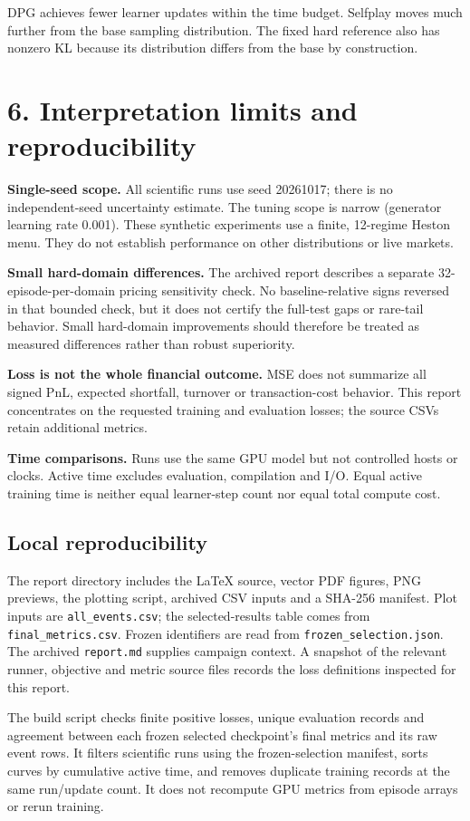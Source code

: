 \documentclass[11pt,a4paper]{article}
\begin{document}
DPG achieves fewer learner updates within the time budget. Selfplay moves much
further from the base sampling distribution. The fixed hard reference also has
nonzero KL because its distribution differs from the base by construction.

\clearpage
\section*{6. Interpretation limits and reproducibility}
\textbf{Single-seed scope.} All scientific runs use seed 20261017; there is no
independent-seed uncertainty estimate. The tuning scope is narrow (generator
learning rate 0.001). These synthetic experiments use a finite, 12-regime Heston
menu. They do not establish performance on other distributions or live markets.

\textbf{Small hard-domain differences.} The archived report describes a separate
32-episode-per-domain pricing sensitivity check. No baseline-relative signs
reversed in that bounded check, but it does not certify the full-test gaps or
rare-tail behavior. Small hard-domain improvements should therefore be treated
as measured differences rather than robust superiority.

\textbf{Loss is not the whole financial outcome.} MSE does not summarize all
signed PnL, expected shortfall, turnover or transaction-cost behavior. This
report concentrates on the requested training and evaluation losses; the source
CSVs retain additional metrics.

\textbf{Time comparisons.} Runs use the same GPU model but not controlled hosts
or clocks. Active time excludes evaluation, compilation and I/O. Equal active
training time is neither equal learner-step count nor equal total compute cost.

\subsection*{Local reproducibility}
The report directory includes the LaTeX source, vector PDF figures, PNG previews,
the plotting script, archived CSV inputs and a SHA-256 manifest. Plot inputs are
\texttt{all\_events.csv}; the selected-results table comes from
\texttt{final\_metrics.csv}. Frozen identifiers are read from
\texttt{frozen\_selection.json}. The archived \texttt{report.md} supplies campaign
context. A snapshot of the relevant runner, objective and metric source files
records the loss definitions inspected for this report.

The build script checks finite positive losses, unique evaluation records and
agreement between each frozen selected checkpoint's final metrics and its raw
event rows. It filters scientific runs using the frozen-selection manifest,
sorts curves by cumulative active time, and removes duplicate training records
at the same run/update count. It does not recompute GPU metrics from episode
arrays or rerun training.
\end{document}
